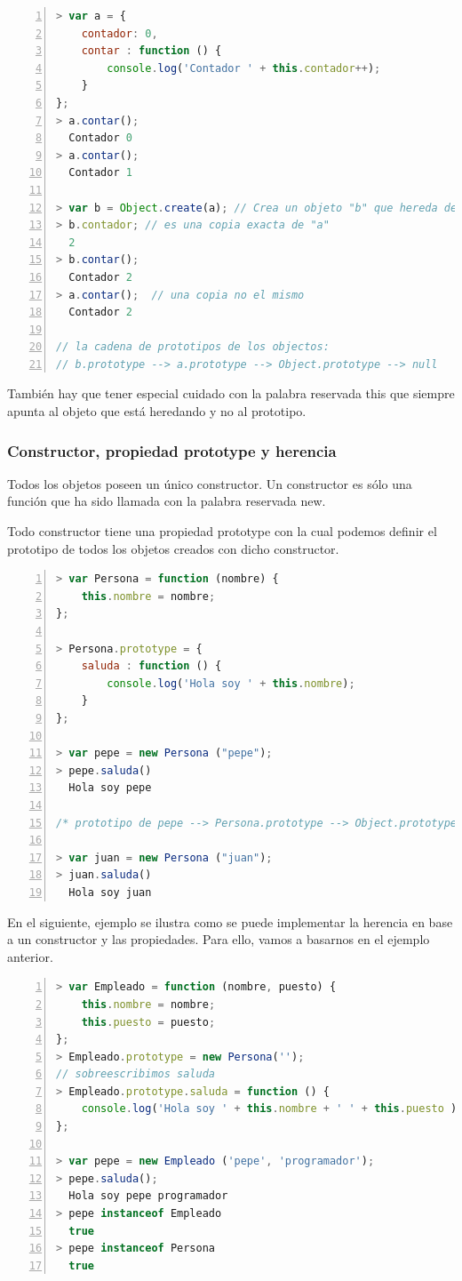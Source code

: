 \begin{lstlisting}[language=JavaScript, numbers=left]
> var a = { 
	contador: 0, 
	contar : function () { 
		console.log('Contador ' + this.contador++); 
	} 
};
> a.contar();
  Contador 0
> a.contar();
  Contador 1

> var b = Object.create(a); // Crea un objeto "b" que hereda de "a"
> b.contador; // es una copia exacta de "a"
  2
> b.contar();
  Contador 2
> a.contar();  // una copia no el mismo
  Contador 2

// la cadena de prototipos de los objectos:
// b.prototype --> a.prototype --> Object.prototype --> null
\end{lstlisting}

También hay que tener especial cuidado con la palabra reservada this que siempre apunta al objeto que está heredando y no al prototipo. 

\subsubsection{Constructor, propiedad prototype y herencia}
Todos los objetos poseen un único constructor. Un constructor es sólo una función que ha sido llamada con la palabra reservada new.

Todo constructor tiene una propiedad prototype con la cual podemos definir el prototipo de todos los objetos creados con dicho constructor.

\begin{lstlisting}[language=JavaScript, numbers=left]
> var Persona = function (nombre) { 
	this.nombre = nombre;
};

> Persona.prototype = {
	saluda : function () {
		console.log('Hola soy ' + this.nombre);
	}
};

> var pepe = new Persona ("pepe");
> pepe.saluda()
  Hola soy pepe

/* prototipo de pepe --> Persona.prototype --> Object.prototype --> null */

> var juan = new Persona ("juan");
> juan.saluda()
  Hola soy juan

\end{lstlisting}

En el siguiente, ejemplo se ilustra como se puede implementar la herencia en base a un constructor y las propiedades. Para ello, vamos a basarnos en el ejemplo anterior.

\begin{lstlisting}[language=JavaScript, numbers=left]
> var Empleado = function (nombre, puesto) { 
	this.nombre = nombre;
	this.puesto = puesto;
};
> Empleado.prototype = new Persona('');
// sobreescribimos saluda
> Empleado.prototype.saluda = function () { 
	console.log('Hola soy ' + this.nombre + ' ' + this.puesto );
};

> var pepe = new Empleado ('pepe', 'programador');
> pepe.saluda();
  Hola soy pepe programador
> pepe instanceof Empleado
  true
> pepe instanceof Persona
  true
\end{lstlisting}

